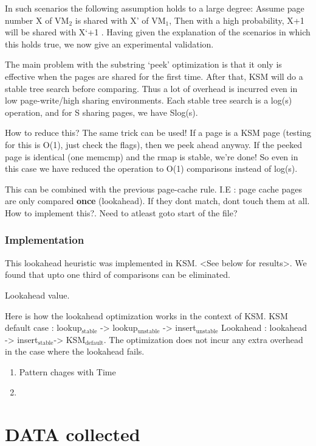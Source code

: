 \documentclass[11pt]{article}
\begin{document}
In such scenarios the following assumption holds to a large degree:
Assume page number X of VM$_2$ is shared with X' of VM$_1$, Then with a high probability, X+1 will be shared with X`+1 .
Having given the explanation of the scenarios in which this holds true, we now give an experimental validation.

The main problem with the substring `peek' optimization is that it only is effective when the pages are shared for the first time. After that, KSM will do a stable tree search before comparing. 
Thus a lot of overhead is incurred even in low page-write/high sharing environments. Each stable tree search is a log(s) operation, and for S sharing pages, we have Slog(s). 

How to reduce this? The same trick can be used! If a page is a KSM page (testing for this is O(1), just check the flags), then we peek ahead anyway. If the peeked page is identical (one memcmp) and the rmap is stable, we're done! So even in this case we have reduced the operation to O(1) comparisons instead of log(s).

This can be combined with the previous page-cache rule.
I.E : page cache pages are only compared \textbf{once} (lookahead). If they dont match, dont touch them at all. 
How to implement this?. Need to atleast goto start of the file?
\subsubsection{Implementation}
\label{sec-9_1_1}

This lookahead heuristic was implemented in KSM. <See below for results>. 
We found that upto one third of comparisons can be eliminated.

Lookahead value.

Here is how the lookahead optimization works in the context of KSM. 
KSM default case : lookup$_{\mathrm{stable}}$ -> lookup$_{\mathrm{unstable}}$ -> insert$_{\mathrm{unstable}}$
Lookahead : lookahead -> insert$_{\mathrm{stable}}$-> KSM$_{\mathrm{default}}$.
The optimization does not incur any extra overhead in the case where the lookahead fails.


\begin{enumerate}
\item Pattern chages with Time
\item 
\end{enumerate}
\section{DATA collected}
\label{sec-10}
\end{document}
